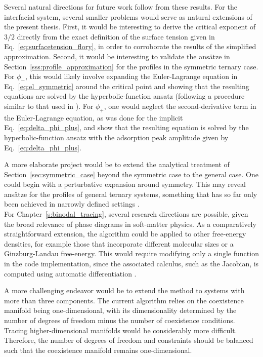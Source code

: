 \documentclass[12pt]{article}
\begin{document}
Several natural directions for future work follow from these results. For the interfacial system, several smaller problems would serve as natural extensions of the present thesis. First, it would be interesting to derive the critical exponent of \(3/2\) directly from the exact definition of the surface tension given in Eq.~\eqref{eq:surfacetension_flory}, in order to corroborate the results of the simplified approximation. Second, it would be interesting to validate the ans\"atze in Section~\ref{sss:profile_approximation} for the profiles in the symmetric ternary case. For \(\phi_-\), this would likely involve expanding the Euler-Lagrange equation in Eq.~\eqref{eq:el_symmetric} around the critical point and showing that the resulting equations are solved by the hyperbolic-function ansatz (following a procedure similar to that used in \cite{Getzinger2026}). For \(\phi_+\), one would neglect the second-derivative term in the Euler-Lagrange equation, as was done for the implicit Eq.~\eqref{eq:delta_phi_plus}, and show that the resulting equation is solved by the hyperbolic-function ansatz with the adsorption peak amplitude given by Eq.~\eqref{eq:delta_phi_plus}.

A more elaborate project would be to extend the analytical treatment of Section~\ref{sec:symmetric_case} beyond the symmetric case to the general case. One could begin with a perturbative expansion around symmetry. This may reveal ans\"atze for the profiles of general ternary systems, something that has so far only been achieved in narrowly defined settings \cite{Getzinger2026}.\\

For Chapter~\ref{s:binodal_tracing}, several research directions are possible, given the broad relevance of phase diagrams in soft-matter physics. As a comparatively straightforward extension, the algorithm could be applied to other free-energy densities, for example those that incorporate different molecular sizes or a Ginzburg-Landau free-energy. This would require modifying only a single function in the code implementation, since the associated calculus, such as the Jacobian, is computed using automatic differentiation \cite{jax2018github}.

A more challenging endeavor would be to extend the method to systems with more than three components. The current algorithm relies on the coexistence manifold being one-dimensional, with its dimensionality determined by the number of degrees of freedom minus the number of coexistence conditions. Tracing higher-dimensional manifolds would be considerably more difficult. Therefore, the number of degrees of freedom and constraints should be balanced such that the coexistence manifold remains one-dimensional.
\end{document}
